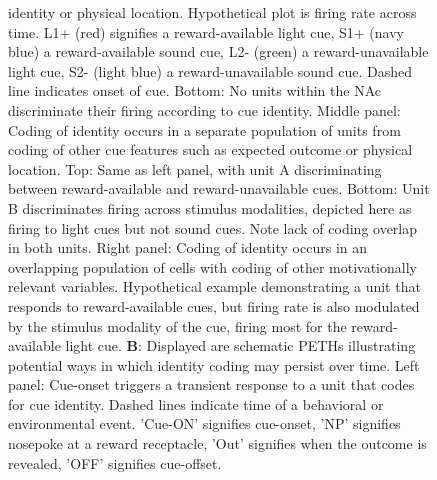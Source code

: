 \documentclass[11pt]{article}
\newcommand{\bsf}[1]{\textbf{#1}}
\providecommand{\DIFadd}[1]{{\protect\color{red} \sf #1}} %
\providecommand{\DIFdel}[1]{} %
\providecommand{\DIFaddFL}[1]{\DIFadd{#1}} %
\providecommand{\DIFdelFL}[1]{\DIFdel{#1}} %
\providecommand{\DIFaddbeginFL}{} %
\providecommand{\DIFaddendFL}{} %
\providecommand{\DIFdelbeginFL}{} %
\providecommand{\DIFdelendFL}{} %
\newcommand{\DIFscaledelfig}{0.5}
\newlength{\DIFdelgraphicswidth} %
\newlength{\DIFdelgraphicsheight} %
\newcommand{\DIFaddincludegraphics}[2][]{{\color{red}\fbox{\DIFOincludegraphics[#1]{#2}}}} %
\newcommand{\DIFdelincludegraphics}[2][]{%
\sbox{\DIFdelgraphicsbox}{\DIFOincludegraphics[#1]{#2}}%
\settoboxwidth{\DIFdelgraphicswidth}{\DIFdelgraphicsbox} %
\settoboxtotalheight{\DIFdelgraphicsheight}{\DIFdelgraphicsbox} %
\scalebox{\DIFscaledelfig}{%
\parbox[b]{\DIFdelgraphicswidth}{\usebox{\DIFdelgraphicsbox}\\[-\baselineskip] \rule{\DIFdelgraphicswidth}{0em}}\llap{\resizebox{\DIFdelgraphicswidth}{\DIFdelgraphicsheight}{%
\setlength{\unitlength}{\DIFdelgraphicswidth}%
\begin{picture}(1,1)%
\thicklines\linethickness{2pt} %
{\color[rgb]{1,0,0}\put(0,0){\framebox(1,1){}}}%
{\color[rgb]{1,0,0}\put(0,0){\line( 1,1){1}}}%
{\color[rgb]{1,0,0}\put(0,1){\line(1,-1){1}}}%
\end{picture}%
}\hspace*{3pt}}} %
} %
\DeclareRobustCommand{\DIFaddbeginFL}{\DIFOaddbeginFL \let\includegraphics\DIFaddincludegraphics} %
\DeclareRobustCommand{\DIFaddendFL}{\DIFOaddendFL \let\includegraphics\DIFOincludegraphics} %
\DeclareRobustCommand{\DIFdelbeginFL}{\DIFOdelbeginFL \let\includegraphics\DIFdelincludegraphics} %
\DeclareRobustCommand{\DIFdelendFL}{\DIFOaddendFL \let\includegraphics\DIFOincludegraphics} %
\begin{document}
\begin{figure}[ht!]
{{  }\DIFdelendFL identity or physical location. Hypothetical plot is firing rate across time. L1+ (red) signifies a reward-available light cue, S1+ (navy blue) a reward-available sound cue, L2- (green) a reward-unavailable light cue, S2- (light blue) a reward-unavailable sound cue. Dashed line indicates onset of cue. Bottom: No units within the NAc discriminate their firing according to cue identity. \DIFdelbeginFL \DIFdelFL{H2 (middle }\DIFdelendFL \DIFaddbeginFL \DIFaddFL{Middle }\DIFaddendFL panel\DIFdelbeginFL \DIFdelFL{)}\DIFdelendFL : Coding of \DIFdelbeginFL \DIFdelFL{cue }\DIFdelendFL identity occurs \DIFdelbeginFL \DIFdelFL{independently }\DIFdelendFL \DIFaddbeginFL \DIFaddFL{in a separate population }\DIFaddendFL of \DIFdelbeginFL \DIFdelFL{encoding }\DIFdelendFL \DIFaddbeginFL \DIFaddFL{units from coding }\DIFaddendFL of \DIFdelbeginFL \DIFdelFL{motivationally relevant variables }\DIFdelendFL \DIFaddbeginFL \DIFaddFL{other cue features }\DIFaddendFL such as expected outcome or \DIFdelbeginFL \DIFdelFL{subsequent vigor}\DIFdelendFL \DIFaddbeginFL \DIFaddFL{physical location}\DIFaddendFL . Top: Same as \DIFdelbeginFL \DIFdelFL{H1}\DIFdelendFL \DIFaddbeginFL \DIFaddFL{left panel}\DIFaddendFL , with unit A discriminating between reward-available and reward-unavailable cues. Bottom: Unit B discriminates firing across stimulus modalities, depicted here as firing to light cues but not sound cues. \DIFdelbeginFL \DIFdelFL{H3 (right }\DIFdelendFL \DIFaddbeginFL \DIFaddFL{Note lack of coding overlap in both units. Right }\DIFaddendFL panel\DIFdelbeginFL \DIFdelFL{)}\DIFdelendFL : Coding of \DIFdelbeginFL \DIFdelFL{cue }\DIFdelendFL identity \DIFdelbeginFL \DIFdelFL{is integrated }\DIFdelendFL \DIFaddbeginFL \DIFaddFL{occurs in an overlapping population of cells }\DIFaddendFL with coding of other motivationally relevant variables. Hypothetical example demonstrating a unit that responds to \DIFdelbeginFL \DIFdelFL{outcome-predictive
  }\DIFdelendFL \DIFaddbeginFL \DIFaddFL{reward-available }\DIFaddendFL cues, but firing rate is also modulated by \DIFaddbeginFL \DIFaddFL{the stimulus modality of the }\DIFaddendFL cue\DIFdelbeginFL \DIFdelFL{identity}\DIFdelendFL , firing most for the reward-available light cue. \bsf{B}: Displayed are schematic PETHs illustrating potential ways in which \DIFdelbeginFL \DIFdelFL{cue }\DIFdelendFL identity \DIFdelbeginFL \DIFdelFL{signals }\DIFdelendFL \DIFaddbeginFL \DIFaddFL{coding }\DIFaddendFL may persist over time. \DIFdelbeginFL \DIFdelFL{H1 (left }\DIFdelendFL \DIFaddbeginFL \DIFaddFL{Left }\DIFaddendFL panel\DIFdelbeginFL \DIFdelFL{)}\DIFdelendFL : Cue-onset triggers a transient response to a unit that codes for cue identity. Dashed lines indicate time of a behavioral or environmental event. 'Cue-ON' signifies \DIFdelbeginFL \DIFdelFL{onset of cue}\DIFdelendFL \DIFaddbeginFL \DIFaddFL{cue-onset}\DIFaddendFL , 'NP' signifies \DIFdelbeginFL \DIFdelFL{when the rat holds a }\DIFdelendFL nosepoke at a reward receptacle, 'Out' signifies when the outcome is revealed, 'OFF' signifies \DIFdelbeginFL \DIFdelFL{when the cue turns off}\DIFdelendFL \DIFaddbeginFL \DIFaddFL{cue-offset}\DIFaddendFL . \DIFdelbeginFL \DIFdelFL{H2 (middle
}}
\end{figure}
\end{document}
